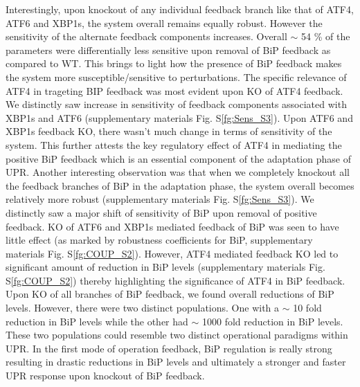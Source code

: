 \documentclass[12pt]{article}
\begin{document}
Interestingly, upon knockout of any individual feedback branch like that of ATF4, ATF6 and XBP1s, the system overall remains equally robust. However the sensitivity of the alternate feedback components increases. Overall $\sim$ 54 \% of the parameters were differentially less sensitive upon removal of BiP feedback as compared to WT. This brings to light how the presence of BiP feedback makes the system more susceptible/sensitive to perturbations. The specific relevance of ATF4 in trageting BIP feedback was most evident upon KO of ATF4 feedback. We distinctly saw increase in sensitivity of feedback components associated with XBP1s and ATF6 (supplementary materials Fig. S\ref{fg:Sens_S3}). Upon ATF6 and XBP1s feedback KO, there wasn't much change in terms of sensitivity of the system. This further attests the key regulatory effect of ATF4 in mediating the positive BiP feedback which is an essential component of the adaptation phase of UPR. Another interesting observation was that when we completely knockout all the feedback branches of BiP in the adaptation phase, the system overall becomes relatively more robust (supplementary materials Fig. S\ref{fg:Sens_S3}). We distinctly saw a major shift of sensitivity of BiP upon removal of positive feedback. KO of ATF6 and XBP1s mediated feedback of BiP was seen to have little effect (as marked by robustness coefficients for BiP, supplementary materials Fig. S\ref{fg:COUP_S2}). However, ATF4 mediated feedback KO led to significant amount of reduction in BiP levels (supplementary materials Fig. S\ref{fg:COUP_S2}) thereby highlighting the significance of ATF4 in BiP feedback. Upon KO of all branches of BiP feedback, we found overall reductions of BiP levels. However, there were two distinct populations. One with a $\sim$ 10 fold reduction in BiP levels while the other had $\sim$ 1000 fold reduction in BiP levels. These two populations could resemble two distinct operational paradigms within UPR. In the first mode of operation feedback, BiP regulation is really strong resulting in drastic reductions in BiP levels and ultimately a stronger and faster UPR response upon knockout of BiP feedback. 
\end{document}
